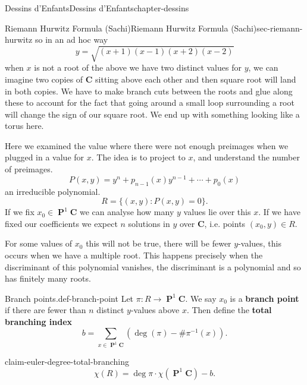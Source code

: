 \documentclass[oneside,10pt,]{book}
\newcommand{\terminology}[1]{\textbf{#1}}
\numberwithin{equation}{section}
\newcommand{\inv}{^{-1}}
\newcommand{\CC}{\mathbf{C}}
\DeclareMathOperator{\PP}{\mathbf{P}}
\begin{document}
\begin{chapterptx}{Dessins d'Enfants}{}{Dessins d'Enfants}{}{}{chapter-dessins}
\begin{sectionptx}{Riemann Hurwitz Formula (Sachi)}{}{Riemann Hurwitz Formula (Sachi)}{}{}{sec-riemann-hurwitz}
so in an ad hoc way%
\begin{equation*}
y = \sqrt{(x+1)(x-1)(x+2)(x-2)}
\end{equation*}
when \(x\) is not a root of the above we have two distinct values for \(y\), we can imagine two copies of \(\CC\) sitting above each other and then square root will land in both copies. We have to make branch cuts between the roots and glue along these to account for the fact that going around a small loop surrounding a root will change the sign of our square root. We end up with something looking like a torus here.%
\par
\hypertarget{p-512}{}%
Here we examined the value where there were not enough preimages when we plugged in a value for \(x\). The idea is to project to \(x\), and understand the number of preimages.%
\begin{equation*}
P(x,y) = y^n + p_{n-1}(x) y^{n-1} + \cdots + p_0(x)
\end{equation*}
an  irreducible polynomial.%
\begin{equation*}
R= \{(x,y) : P(x,y) = 0\}\text{.}
\end{equation*}
If we fix \(x_0 \in \PP^1 \CC\) we can analyse how many \(y\) values lie over this \(x\). If we have fixed our coefficients we expect \(n\) solutions in \(y\) over \(\CC\), i.e. points \((x_0,y)\in R\).%
\par
\hypertarget{p-513}{}%
For some values of \(x_0\) this will not be true, there will be fewer \(y\)-values, this occurs when we have a multiple root. This happens precisely when the discriminant of this polynomial vanishes, the discriminant is a polynomial and so has finitely many roots.%
\begin{definition}{Branch points.}{def-branch-point}%
\hypertarget{p-514}{}%
Let \(\pi\colon R \to \PP^1 \CC\). We say \(x_0\) is a \terminology{branch point} if there are fewer than \(n\) distinct \(y\)-values above \(x\). Then define the \terminology{total branching index}%
\begin{equation*}
b = \sum_{x\in \PP^1 \CC} (\deg(\pi) - \# \pi\inv (x))\text{.}
\end{equation*}
%
\end{definition}
\begin{claim}{}{}{claim-euler-degree-total-branching}%
\hypertarget{p-515}{}%
%
\begin{equation*}
\chi(R) = \deg \pi \cdot \chi(\PP^1\CC)  - b\text{.}
\end{equation*}
%
\end{claim}

\end{sectionptx}
\end{chapterptx}
\end{document}
